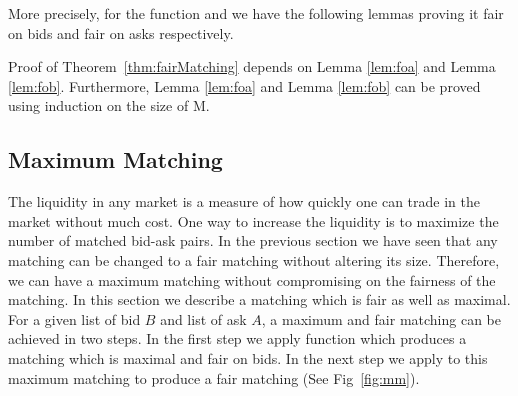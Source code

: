 \documentclass[a4paper,UKenglish,cleveref, autoref]{lipics-v2019}
\begin{document}
More precisely, for the function  and  we have the following lemmas proving it fair on bids and fair on asks respectively. 
\begin{lemma}\label{lem:fob}
\end{lemma}

\begin{lemma}\label{lem:foa}
\end{lemma}

\begin{theorem}\label{thm:fairMatching}
\end{theorem}

Proof of Theorem~\ref{thm:fairMatching} depends on Lemma \ref{lem:foa} and Lemma \ref{lem:fob}. Furthermore, Lemma \ref{lem:foa} and Lemma \ref{lem:fob} can be proved using induction on the size of M. 

\subsection{Maximum Matching}

The liquidity in any market is a measure of how quickly one can trade in the market without much cost. One way to increase the liquidity is to maximize the number of matched bid-ask pairs. In the previous section we have seen that any matching can be changed to a fair matching without altering its size. Therefore, we can have a maximum matching without compromising on the fairness of the matching. In this section we describe a matching which is fair as well as maximal. For a given list of bid $B$ and list of ask $A$, a maximum and fair matching can be achieved in two steps. In the first step we apply function  which produces a matching which is maximal and fair on bids. In the next step we apply  to this maximum matching to produce a fair matching (See Fig~\ref{fig:mm}).
\end{document}
